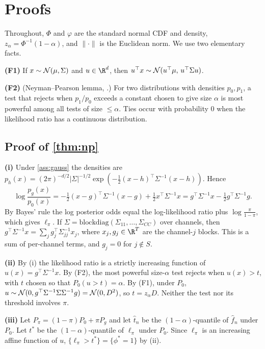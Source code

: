 \section{Proofs}
\label{app:proofs}
Throughout, $\Phi$ and $\varphi$ are the standard normal CDF and density, $z_\alpha=\Phi^{-1}(1-\alpha)$, and $\|\cdot\|$ is the Euclidean norm. We use two elementary facts.

\textbf{(F1)} If $x\sim\mathcal{N}(\mu,\Sigma)$ and $u\in\R^d$, then $u^\top x\sim\mathcal{N}(u^\top\mu,\,u^\top\Sigma u)$.

\textbf{(F2)} (Neyman--Pearson lemma, \citealp{neyman1933,lehmann2005}.) For two distributions with densities $p_0,p_1$, a test that rejects when $p_1/p_0$ exceeds a constant chosen to give size $\alpha$ is most powerful among all tests of size $\le\alpha$. Ties occur with probability $0$ when the likelihood ratio has a continuous distribution.

\subsection{Proof of \texorpdfstring{\cref{thm:np}}{Theorem 1}}
\textbf{(i)} Under \cref{ass:gauss} the densities are $p_h(x)=(2\pi)^{-d/2}|\Sigma|^{-1/2}\exp(-\frac12(x-h)^\top\Sigma^{-1}(x-h))$. Hence
\[
\log\frac{p_g(x)}{p_0(x)}=-\tfrac12(x-g)^\top\Sigma^{-1}(x-g)+\tfrac12x^\top\Sigma^{-1}x=g^\top\Sigma^{-1}x-\tfrac12g^\top\Sigma^{-1}g .
\]
By Bayes' rule the log posterior odds equal the log-likelihood ratio plus $\log\frac{\pi}{1-\pi}$, which gives $\ell_\pi$. If $\Sigma=\mathrm{blockdiag}(\Sigma_{11},\dots,\Sigma_{CC})$ over channels, then $g^\top\Sigma^{-1}x=\sum_{j}g_j^\top\Sigma_{jj}^{-1}x_j$, where $x_j,g_j\in\R^T$ are the channel-$j$ blocks. This is a sum of per-channel terms, and $g_j=0$ for $j\notin S$.

\textbf{(ii)} By (i) the likelihood ratio is a strictly increasing function of $u(x)=g^\top\Sigma^{-1}x$. By (F2), the most powerful size-$\alpha$ test rejects when $u(x)>t$, with $t$ chosen so that $P_0(u>t)=\alpha$. By (F1), under $P_0$, $u\sim\mathcal{N}(0,g^\top\Sigma^{-1}\Sigma\Sigma^{-1}g)=\mathcal{N}(0,D^2)$, so $t=z_\alpha D$. Neither the test nor its threshold involves $\pi$.

\textbf{(iii)} Let $P_\pi=(1-\pi)P_0+\pi P_g$ and let $\hat t_n$ be the $(1-\alpha)$-quantile of $\hat f_n$ under $P_0$. Let $t^*$ be the $(1-\alpha)$-quantile of $\ell_\pi$ under $P_0$. Since $\ell_\pi$ is an increasing affine function of $u$, $\{\ell_\pi>t^*\}=\{\phi^*=1\}$ by (ii).

